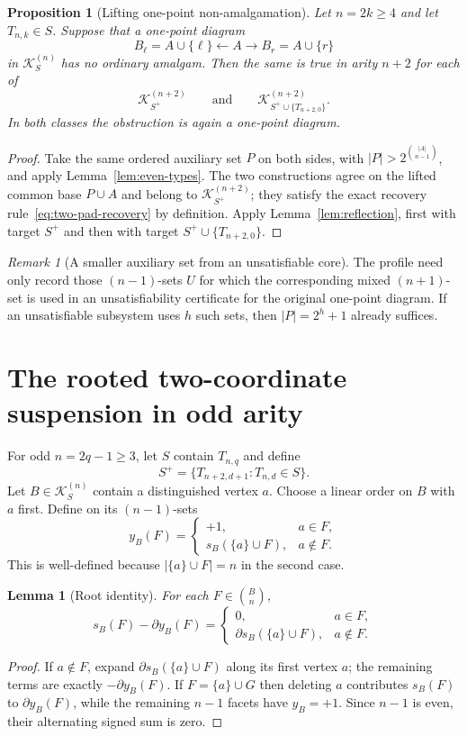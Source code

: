 \documentclass[11pt,a4paper]{article}
\newtheorem{lemma}[theorem]{Lemma}
\newtheorem{proposition}[theorem]{Proposition}
\theoremstyle{remark}
\newtheorem{remark}[theorem]{Remark}
\newcommand{\K}{\mathcal K}
\begin{document}
\begin{proposition}[Lifting one-point non-amalgamation]\label{prop:even-lift}
Let $n=2k\ge4$ and let $T_{n,k}\in S$.
Suppose that a one-point diagram
\[
 B_\ell=A\cup\{\ell\}\longleftarrow A
 \longrightarrow B_r=A\cup\{r\}
\]
in $\K^{(n)}_S$ has no \emph{ordinary} amalgam.  Then the same is true
in arity $n+2$ for each of
\[
 \K^{(n+2)}_{S^+}
 \qquad\text{and}\qquad
 \K^{(n+2)}_{S^+\cup\{T_{n+2,0}\}}.
\]
In both classes the obstruction is again a one-point diagram.
\end{proposition}
\begin{proof}
Take the same ordered auxiliary set $P$ on both sides, with
$|P|>2^{\binom{|A|}{n-1}}$, and apply
Lemma~\ref{lem:even-types}.
The two constructions agree on the lifted common base $P\cup A$
and belong to $\K^{(n+2)}_{S^+}$; they satisfy the exact
recovery rule~\eqref{eq:two-pad-recovery} by definition.
Apply Lemma~\ref{lem:reflection}, first with target $S^+$ and
then with target $S^+\cup\{T_{n+2,0}\}$.
\end{proof}

\begin{remark}[A smaller auxiliary set from an unsatisfiable core]
\label{rem:core}
The profile need only record those $(n-1)$-sets $U$ for which the
corresponding mixed $(n+1)$-set is used in an unsatisfiability certificate
for the original one-point diagram.  If an unsatisfiable subsystem uses
$h$ such sets, then $|P|=2^h+1$ already suffices.
\end{remark}



\section{The rooted two-coordinate suspension in odd arity}\label{sec:odd-lift}
For odd $n=2q-1\ge3$, let $S$ contain $T_{n,q}$ and define
\[
 S^+=\{T_{n+2,d+1}:T_{n,d}\in S\}.
\]
Let $B\in\K^{(n)}_S$ contain a distinguished vertex $a$.
Choose a linear order on $B$ with $a$ first. Define on its $(n-1)$-sets
\[
 y_B(F)=
 \begin{cases}
 +1,&a\in F,\\
 s_B(\{a\}\cup F),&a\notin F.
 \end{cases}
 \tag{2.1}\label{eq:root-potential}
\]
This is well-defined because $|\{a\}\cup F|=n$ in the second case.

\begin{lemma}[Root identity]\label{lem:odd-root}
For each $F\in\binom Bn$,
\[
 s_B(F)-\partial y_B(F)=
 \begin{cases}
 0,&a\in F,\\
 \partial s_B(\{a\}\cup F),&a\notin F.
 \end{cases}
 \tag{2.2}\label{eq:root-identity}
\]
\end{lemma}
\begin{proof}
If $a\notin F$, expand $\partial s_B(\{a\}\cup F)$ along its
first vertex $a$; the remaining terms are exactly $-\partial y_B(F)$.
If $F=\{a\}\cup G$ then deleting $a$ contributes $s_B(F)$ to
$\partial y_B(F)$, while the remaining $n-1$ facets have $y_B=+1$.
Since $n-1$ is even, their alternating signed sum is zero.
\end{proof}
\end{document}
